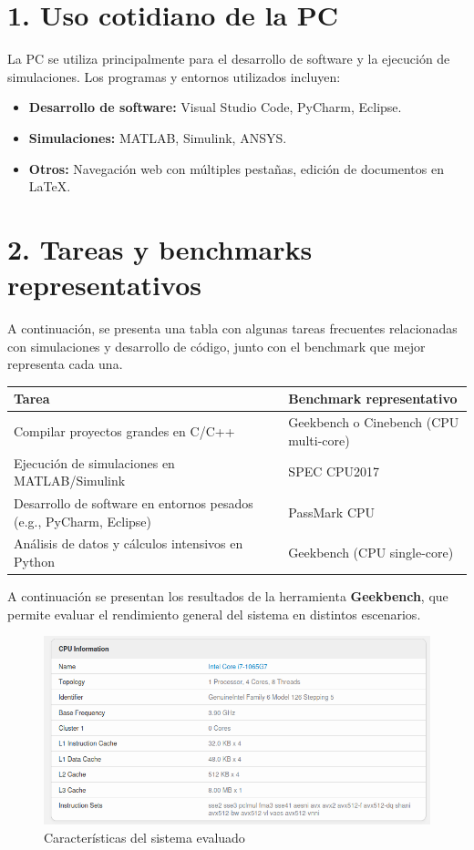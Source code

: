 \section*{1. Uso cotidiano de la PC}
La PC se utiliza principalmente para el desarrollo de software y la ejecución de simulaciones. Los programas y entornos utilizados incluyen:

\begin{itemize}
    \item \textbf{Desarrollo de software:} Visual Studio Code, PyCharm, Eclipse.
    \item \textbf{Simulaciones:} MATLAB, Simulink, ANSYS.
    \item \textbf{Otros:} Navegación web con múltiples pestañas, edición de documentos en \LaTeX.
\end{itemize}

\section*{2. Tareas y benchmarks representativos}

A continuación, se presenta una tabla con algunas tareas frecuentes relacionadas con simulaciones y desarrollo de código, junto con el benchmark que mejor representa cada una.

\begin{center}
\begin{tabular}{|p{7cm}|p{7cm}|}
\hline
\textbf{Tarea} & \textbf{Benchmark representativo} \\
\hline
Compilar proyectos grandes en C/C++ & Geekbench o Cinebench (CPU multi-core) \\
\hline
Ejecución de simulaciones en MATLAB/Simulink & SPEC CPU2017 \\
\hline
Desarrollo de software en entornos pesados (e.g., PyCharm, Eclipse) & PassMark CPU \\
\hline
Análisis de datos y cálculos intensivos en Python & Geekbench (CPU single-core) \\
\hline
\end{tabular}
\end{center}

A continuación se presentan los resultados de la herramienta \textbf{Geekbench}, que permite evaluar el rendimiento general del sistema en distintos escenarios.

\begin{figure}[H]
    \centering
    \includegraphics[width=0.7\linewidth]{img/sistema.png}
    \caption{Características del sistema evaluado}
    \label{fig:prestaciones}
\end{figure}

